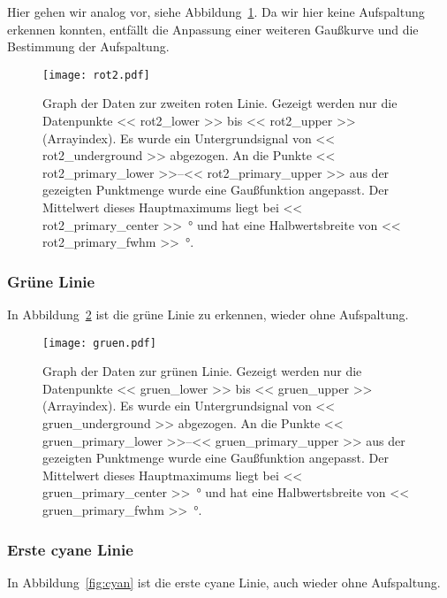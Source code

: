 Hier gehen wir analog vor, siehe Abbildung~\ref{fig:rot2}. Da wir hier keine
Aufspaltung erkennen konnten, entfällt die Anpassung einer weiteren Gaußkurve
und die Bestimmung der Aufspaltung.

\begin{figure}[htbp]
    \centering
    \texttt{[image: rot2.pdf]}
    \caption{%
        Graph der Daten zur zweiten roten Linie. Gezeigt werden nur die
        Datenpunkte \num{<< rot2_lower >>} bis \num{<< rot2_upper >>}
        (Arrayindex). Es wurde ein Untergrundsignal von \num{<< rot2_underground
        >>} abgezogen. An die Punkte \numrange{<< rot2_primary_lower >>}{<<
        rot2_primary_upper >>} aus der gezeigten Punktmenge wurde eine
        Gaußfunktion angepasst. Der Mittelwert dieses Hauptmaximums liegt bei
        \SI{<< rot2_primary_center >>}{\degree} und hat eine Halbwertsbreite von
        \SI{<< rot2_primary_fwhm >>}{\degree}.
    }
    \label{fig:rot2}
\end{figure}

\subsubsection{Grüne Linie}

In Abbildung~\ref{fig:gruen} ist die grüne Linie zu erkennen, wieder ohne
Aufspaltung.

\begin{figure}[htbp]
    \centering
    \texttt{[image: gruen.pdf]}
    \caption{%
        Graph der Daten zur grünen Linie. Gezeigt werden nur die Datenpunkte
        \num{<< gruen_lower >>} bis \num{<< gruen_upper >>} (Arrayindex). Es
        wurde ein Untergrundsignal von \num{<< gruen_underground >>} abgezogen.  An die
        Punkte \numrange{<< gruen_primary_lower >>}{<< gruen_primary_upper >>} aus
        der gezeigten Punktmenge wurde eine Gaußfunktion angepasst. Der
        Mittelwert dieses Hauptmaximums liegt bei \SI{<< gruen_primary_center
        >>}{\degree} und hat eine Halbwertsbreite von \SI{<< gruen_primary_fwhm
        >>}{\degree}.
    }
    \label{fig:gruen}
\end{figure}

\subsubsection{Erste cyane Linie}

In Abbildung~\ref{fig:cyan} ist die erste cyane Linie, auch wieder ohne
Aufspaltung.


